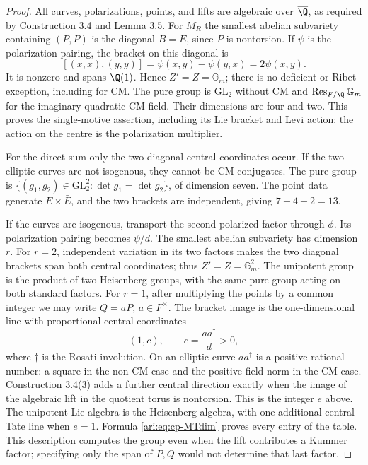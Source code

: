 \begin{proof}
All curves, polarizations, points, and lifts are algebraic over
$\overline\Q$, as required by Construction 3.4 and Lemma 3.5.
For $M_R$ the smallest abelian subvariety containing $(P,P)$ is
the diagonal $B=E$, since $P$ is nontorsion. If $\psi$ is the
polarization pairing, the bracket on this diagonal is
\[
 [(x,x),(y,y)]=\psi(x,y)-\psi(y,x)=2\psi(x,y).
\]
It is nonzero and spans $\Q(1)$. Hence $Z'=Z=\mathbb G_m$;
there is no deficient or Ribet exception, including for CM.
The pure group is $\mathrm{GL}_2$ without CM and
$\operatorname{Res}_{F/\Q}\mathbb G_m$ for the imaginary
quadratic CM field. Their dimensions are four and two.
This proves the single-motive assertion, including its Lie
bracket and Levi action: the action on the centre is the
polarization multiplier.

For the direct sum only the two diagonal central coordinates
occur. If the two elliptic curves are not isogenous, they
cannot be CM conjugates. The pure group is
$\{(g_1,g_2)\in\mathrm{GL}_2^2:\det g_1=\det g_2\}$,
of dimension seven. The point data generate $E\times\bar E$,
and the two brackets are independent, giving $7+4+2=13$.

If the curves are isogenous, transport the second polarized
factor through $\phi$. Its polarization pairing becomes
$\psi/d$. The smallest abelian subvariety has dimension $r$.
For $r=2$, independent variation in its two factors makes the
two diagonal brackets span both central coordinates; thus
$Z'=Z=\mathbb G_m^2$. The unipotent group is the product
of two Heisenberg groups, with the same pure group acting
on both standard factors.
For $r=1$, after multiplying the points by a common integer
we may write $Q=aP$, $a\in F^\times$. The bracket image is
the one-dimensional line with proportional central coordinates
\begin{equation}\label{ari:eq:cp-positive-centre}
 (1,c),\qquad c=\frac{a a^\dagger}{d}>0,
\end{equation}
where $\dagger$ is the Rosati involution. On an elliptic curve
$aa^\dagger$ is a positive rational number: a square in the
non-CM case and the positive field norm in the CM case.
Construction 3.4(3) adds a further central direction exactly
when the image of the algebraic lift in the quotient torus
is nontorsion. This is the integer $e$ above.
The unipotent Lie algebra is the Heisenberg algebra, with one
additional central Tate line when $e=1$. Formula
\eqref{ari:eq:cp-MTdim} proves every entry of the table. This
description computes the group even when the lift contributes
a Kummer factor; specifying only the span of $P,Q$ would
not determine that last factor.
\end{proof}

